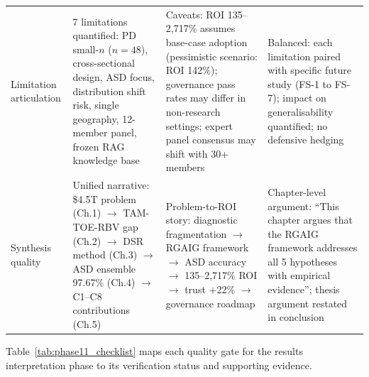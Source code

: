 \begin{xltabular}{\textwidth}{@{} >{\raggedright\arraybackslash}p{0.14\textwidth} X X X @{}}
\addlinespace
Limitation articulation    & 7 limitations quantified: PD small-$n$ ($n = 48$), cross-sectional design, ASD focus, distribution shift risk, single geography, 12-member panel, frozen RAG knowledge base & Caveats: ROI 135--2{,}717\% assumes base-case adoption (pessimistic scenario: ROI 142\%); governance pass rates may differ in non-research settings; expert panel consensus may shift with 30+ members & Balanced: each limitation paired with specific future study (FS-1 to FS-7); impact on generalisability quantified; no defensive hedging \\
\addlinespace
Synthesis quality          & Unified narrative: \$4.5T problem (Ch.1) $\rightarrow$ TAM-TOE-RBV gap (Ch.2) $\rightarrow$ DSR method (Ch.3) $\rightarrow$ ASD ensemble 97.67\% (Ch.4) $\rightarrow$ C1--C8 contributions (Ch.5) & Problem-to-ROI story: diagnostic fragmentation $\rightarrow$ RGAIG framework $\rightarrow$ ASD accuracy $\rightarrow$ 135--2{,}717\% ROI $\rightarrow$ trust $+$22\% $\rightarrow$ governance roadmap & Chapter-level argument: ``This chapter argues that the RGAIG framework addresses all 5 hypotheses with empirical evidence''; thesis argument restated in conclusion \\
\end{xltabular}
\endgroup

\vspace{1.5em}

Table~\ref{tab:phase11_checklist} maps each quality gate for the results interpretation phase to its verification status and supporting evidence.

